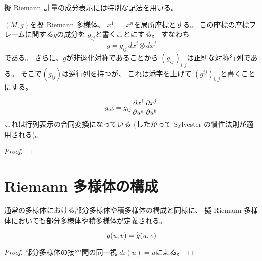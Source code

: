 \documentclass[report]{jlreq}
\begin{document}
擬 Riemann 計量の成分表示には特別な記法を用いる。

\begin{definition}[計量の成分表示]
    $(M, g)$を擬 Riemann 多様体、
    $x^1, \ldots, x^n$を局所座標とする。
    この座標の座標フレームに関する$g$の成分を
    $g_{ij}$と書くことにする。
    すなわち
    \begin{equation}
        g = g_{ij} \, dx^i \otimes dx^j
    \end{equation}
    である。
    さらに、$g$が非退化対称であることから
    $(g_{ij})_{i, j}$は正則な対称行列である。
    そこで$(g_{ij})$は逆行列を持つが、
    これは添字を上げて
    $(g^{ij})_{i, j}$と書くことにする。
\end{definition}

\begin{proposition}[計量の成分と座標変換]
    \begin{equation}
        g_{ab} = g_{ij} \deldel[x^i]{u^a} \deldel[x^j]{u^b}
    \end{equation}
    これは行列表示の合同変換になっている
    (したがって Sylvester の慣性法則が適用される)。
    \TODO{}
\end{proposition}

\begin{proof}
    \TODO{}
\end{proof}

%
\section{Riemann 多様体の構成}

通常の多様体における部分多様体や積多様体の構成と同様に、
擬 Riemann 多様体においても部分多様体や積多様体が定義される。

\begin{definition}
    \TODO{}
\end{definition}

\begin{proposition}
    \begin{equation}
        g(u, v) = \widetilde{g}(u, v)
    \end{equation}
    \TODO{}
\end{proposition}

\begin{proof}
    部分多様体の接空間の同一視
    $d\iota(u) = u$による。
    \TODO{}
\end{proof}
\end{document}
